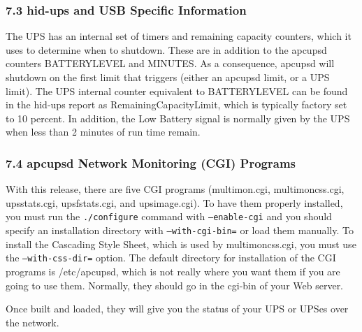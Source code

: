 \label{hid_002dups-and-USB-Specific-Information}

\subsubsection*{7.3 hid-ups and USB Specific Information}

\label{index-hid_002dups-118}
The UPS has an internal set of timers and remaining capacity counters, which
it uses to determine when to shutdown. These are in addition to the apcupsd
counters BATTERYLEVEL and MINUTES.  As a consequence, apcupsd will shutdown on
the first limit that triggers (either an apcupsd limit, or a UPS limit). The
UPS internal counter equivalent to BATTERYLEVEL can be found in the hid-ups
report as RemainingCapacityLimit, which is typically factory set to 10
percent. In addition, the Low Battery signal is normally given by the UPS when
less than 2 minutes of run time remain. 

\label{apcupsd-Network-Monitoring-_005bCGI_005d-Programs}

\subsubsection*{7.4 apcupsd Network Monitoring (CGI) Programs}

\label{index-Network-monitoring-119}
\label{index-Monitoring-120}
\label{index-CGI-programs-121}
With this release, there are five CGI programs (multimon.cgi, multimoncss.cgi,
upsstats.cgi, upsfstats.cgi, and upsimage.cgi). To have them properly
installed, you must run the {\tt ./configure} command with {\tt --enable-cgi}
and you should specify an installation directory with {\tt --with-cgi-bin=} or
load them manually. To install the Cascading Style Sheet, which is used by
multimoncss.cgi, you must use the {\tt --with-css-dir=} option. The default
directory for installation of the CGI programs is /etc/apcupsd, which is not
really where you want them if you are going to use them. Normally, they should
go in the cgi-bin of your Web server.  

Once built and loaded, they will give you the status of your UPS or UPSes over
the network.  

